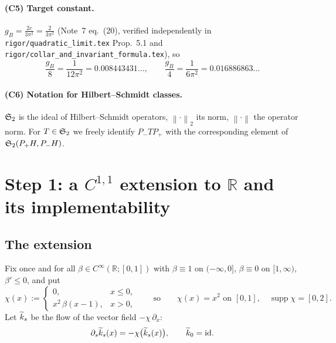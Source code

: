 \documentclass[11pt]{article}
\newcommand{\Pp}{P_+}\newcommand{\Pm}{P_-}
\newcommand{\norm}[1]{\left\lVert #1\right\rVert}\newcommand{\abs}[1]{\left|#1\right|}
\begin{document}
\paragraph{(C5) Target constant.}
$g_B=\frac{2c}{3\pi^2}=\frac2{3\pi^2}$ (Note~7 eq.~(20), verified independently in
\texttt{rigor/quadratic\_limit.tex} Prop.~5.1 and \texttt{rigor/collar\_and\_invariant\_formula.tex}),
so
\begin{equation}\label{eq:target}
 \frac{g_B}8=\frac1{12\pi^2}=0.008443431\ldots,\qquad \frac{g_B}4=\frac1{6\pi^2}=0.016886863\ldots
\end{equation}

\paragraph{(C6) Notation for Hilbert--Schmidt classes.}
$\mathfrak S_2$ is the ideal of Hilbert--Schmidt operators, $\norm\cdot_2$ its norm, $\norm\cdot$ the
operator norm.  For $T\in\mathfrak S_2$ we freely identify $\Pm T\Pp$ with the corresponding element of
$\Stwo(\Pp H,\Pm H)$.

\section{Step 1: a $C^{1,1}$ extension to $\mathbb R$ and its implementability}\label{sec:step1}

\subsection{The extension}
\begin{definition}\label{def:ext}
Fix once and for all $\beta\in C^\infty(\mathbb R;[0,1])$ with $\beta\equiv1$ on $(-\infty,0]$,
$\beta\equiv0$ on $[1,\infty)$, $\beta'\le0$, and put
\begin{equation}\label{eq:chi}
 \chi(x):=\begin{cases}0,&x\le0,\\ x^2\,\beta(x-1),&x>0,\end{cases}
 \qquad\text{so}\qquad
 \chi(x)=x^2 \text{ on }[0,1],\quad \operatorname{supp}\chi=[0,2].
\end{equation}
Let $\widetilde k_s$ be the flow of the vector field $-\chi\,\partial_x$:
\begin{equation}\label{eq:flow}
 \partial_s\widetilde k_s(x)=-\chi\bigl(\widetilde k_s(x)\bigr),\qquad \widetilde k_0=\mathrm{id}.
\end{equation}
\end{definition}
\end{document}
